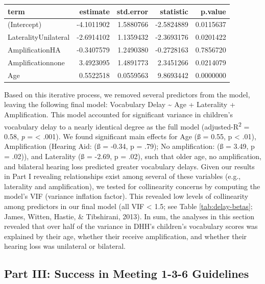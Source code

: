 \documentclass[
  english,
  man]{apa6}
\begin{document}
\begin{table}[H]
\centering
\begin{tabular}{l|r|r|r|r}
\hline
term & estimate & std.error & statistic & p.value\\
\hline
(Intercept) & -4.1011902 & 1.5880766 & -2.5824889 & 0.0115637\\
\hline
LateralityUnilateral & -2.6914102 & 1.1359432 & -2.3693176 & 0.0201422\\
\hline
AmplificationHA & -0.3407579 & 1.2490380 & -0.2728163 & 0.7856720\\
\hline
Amplificationnone & 3.4923095 & 1.4891773 & 2.3451266 & 0.0214079\\
\hline
Age & 0.5522518 & 0.0559563 & 9.8693442 & 0.0000000\\
\hline
\end{tabular}
\end{table}

Based on this iterative process, we removed several predictors from the model, leaving the following final model: Vocabulary Delay \textasciitilde{} Age + Laterality + Amplification. This model accounted for significant variance in children's vocabulary delay to a nearly identical degree as the full model (adjusted-R\textsuperscript{2} = 0.58, \emph{p} = \textless{} .001). We found significant main effects for Age (ß = 0.55, p \textless{} .01), Amplification (Hearing Aid: (ß = -0.34, p = .79); No amplification: (ß = 3.49, p = .02)), and Laterality (ß = -2.69, p = .02), such that older age, no amplification, and bilateral hearing loss predicted greater vocabulary delays. Given our results in Part I revealing relationships exist among several of these variables (e.g., laterality and amplification), we tested for collinearity concerns by computing the model's VIF (variance inflation factor). This revealed low levels of collinearity among predictors in our final model (all VIF \textless{} 1.5; see Table \ref{tab:delay-betas}; James, Witten, Hastie, \& Tibshirani, 2013). In sum, the analyses in this section revealed that over half of the variance in DHH's children's vocabulary scores was explained by their age, whether their receive amplification, and whether their hearing loss was unilateral or bilateral.

\hypertarget{part-iii-success-in-meeting-1-3-6-guidelines}{%
\subsection{Part III: Success in Meeting 1-3-6 Guidelines}\label{part-iii-success-in-meeting-1-3-6-guidelines}}
\end{document}
